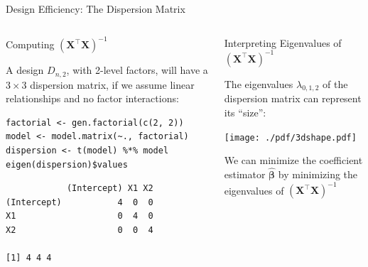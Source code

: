 \documentclass[10pt, compress, aspectratio=169, xcolor={table,usenames,dvipsnames}]{beamer}
\begin{document}
\begin{frame}[label={sec:org6e7f613},fragile]{Design Efficiency: The Dispersion Matrix}
 \addtocounter{framenumber}{-1}
\begin{columns}
\begin{column}{0.5\columnwidth}
\begin{block}{Computing \(\left(\bm{X}^{\intercal}\bm{X}\right)^{-1}\)}
\vspace{.2cm}

A design \(D_{n,2}\), with \alert{2-level factors}, will have a \(3\times3\)
\alert{dispersion matrix}, if we assume \alert{linear relationships} and no \alert{factor
interactions}:

\vspace{.2cm}

\scriptsize

\lstset{language=r,label= ,caption= ,captionpos=b,numbers=none}
\begin{lstlisting}
factorial <- gen.factorial(c(2, 2))
model <- model.matrix(~., factorial)
dispersion <- t(model) %*% model
eigen(dispersion)$values
\end{lstlisting}

\vspace{-.4cm}

\begin{verbatim}
            (Intercept) X1 X2
(Intercept)           4  0  0
X1                    0  4  0
X2                    0  0  4

[1] 4 4 4
\end{verbatim}


\normalsize
\end{block}
\end{column}

\begin{column}{0.5\columnwidth}
\begin{block}{Interpreting Eigenvalues of \(\left(\bm{X}^{\intercal}\bm{X}\right)^{-1}\)}
\vspace{.1cm}

The \alert{eigenvalues} \(\lambda_{0,1,2}\) of the \alert{dispersion matrix} can
represent its \alert{``size''}:

\vspace{-.3cm}

\begin{center}
\texttt{[image: ./pdf/3dshape.pdf]}
\end{center}

\vspace{-.3cm}

We can \alert{minimize the coefficient estimator} \(\bm{\hat{\beta}}\) by
\alert{minimizing the eigenvalues} of \(\left(\bm{X}^{\intercal}\bm{X}\right)^{-1}\)
\end{block}
\end{column}
\end{columns}
\end{frame}
\end{document}
